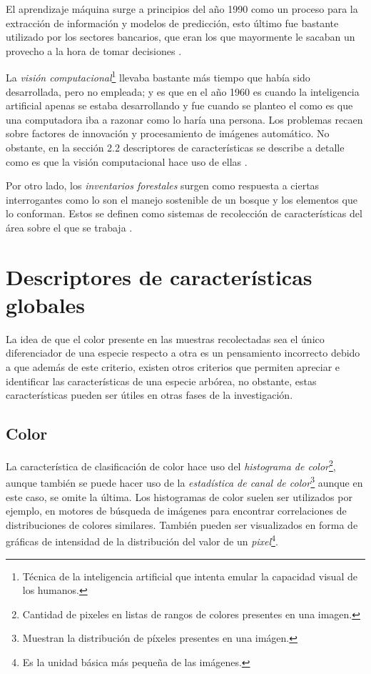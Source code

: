 El aprendizaje máquina surge a principios del año 1990 como un proceso para la extracción de información y modelos de predicción, esto último fue bastante utilizado por los sectores bancarios, que eran los que mayormente le sacaban un provecho a la hora de tomar decisiones \citep{rf5}. 

La \emph{visión computacional}\footnote{Técnica de la inteligencia artificial que intenta emular la capacidad visual de los humanos.} llevaba bastante más tiempo que había sido desarrollada, pero no empleada; y es que en el año 1960 es cuando la inteligencia artificial apenas se estaba desarrollando y fue cuando se planteo el como es que una computadora iba a razonar como lo haría una persona. Los problemas recaen sobre factores de innovación y procesamiento de imágenes automático. No obstante, en la sección 2.2 descriptores de características se describe a detalle como es que la visión computacional hace uso de ellas \citep{rf6}.

Por otro lado, los \emph{inventarios forestales} surgen como respuesta a ciertas interrogantes como lo son el manejo sostenible de un bosque y los elementos que lo conforman. Estos se definen como sistemas de recolección de características del área sobre el que se trabaja \citep{rf7}.

\section{Descriptores de características globales}
La idea de que el color presente en las muestras recolectadas sea el único diferenciador de una especie respecto a otra es un pensamiento incorrecto debido a que además de este criterio, existen otros criterios que permiten apreciar e identificar las características de una especie arbórea, no obstante, estas características pueden ser útiles en otras fases de la investigación. 

\subsection{Color}
La característica de clasificación de color hace uso del \emph{histograma de color}\footnote{Cantidad de pixeles en listas de rangos de colores presentes en una imagen.}, aunque también se puede hacer uso de la \emph{estadística de canal de color}\footnote{Muestran la distribución de píxeles presentes en una imágen.} aunque en este caso, se omite la última. Los histogramas de color suelen ser utilizados por ejemplo, en motores de búsqueda de imágenes para encontrar correlaciones de distribuciones de colores similares. También pueden ser visualizados en forma de gráficas de intensidad de la distribución del valor de un \emph{pixel}\footnote{Es la unidad básica más pequeña de las imágenes.}.

